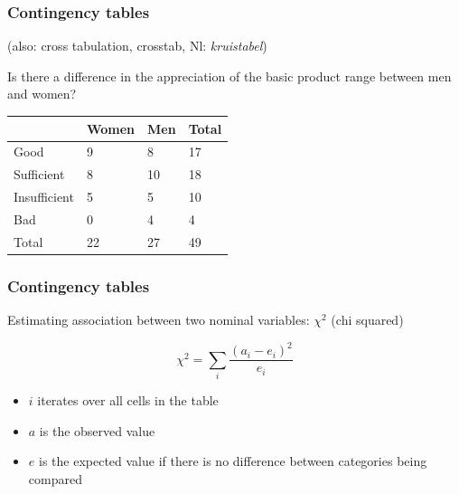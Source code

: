 \documentclass{beamer}
\begin{document}
\begin{frame}
  \frametitle{Contingency tables}
  
  (also: cross tabulation, crosstab, Nl: \emph{kruistabel})
  
  Is there a difference in the appreciation of the basic product range between men and women?
  
  \begin{table}[h]
    \begin{tabular}{l||l|l||l}
                   & Women & Men & Total \\ \hline\hline
      Good         & 9     & 8   & 17    \\
      Sufficient   & 8     & 10  & 18    \\
      Insufficient & 5     & 5   & 10    \\
      Bad          & 0     & 4   & 4     \\ \hline\hline
      Total        & 22    & 27  & 49
    \end{tabular}
  \end{table}
\end{frame}

\begin{frame}
  \frametitle{Contingency tables}
  
  Estimating association between two nominal variables: $\chi^2$ (chi squared)
  
  \[ \chi^2 = \sum_i \frac{(a_i - e_i)^2}{e_i} \]
  
  \begin{itemize}
    \item $i$ iterates over all cells in the table
    \item $a$ is the observed value
    \item $e$ is the expected value if there is no difference between categories being compared
  \end{itemize}
  
\end{frame}
\end{document}
